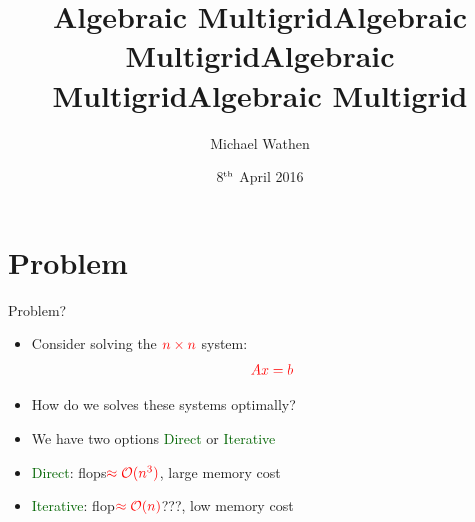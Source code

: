 \documentclass[12pt]{beamer}
\title{Algebraic Multigrid}
\author{Michael Wathen}
\institute{UBC Computer Science}
\date{8$^{\tiny{\mbox{th}}}$ April 2016}
\newcommand{\gr}[1]{\textcolor{darkgreen} {#1}}
\newcommand{\re}[1]{{\textcolor{red}       {#1}}}
\begin{document}
\begin{frame}

\title{Algebraic Multigrid}
\titlepage
\title{Algebraic Multigrid}

\end{frame}

\title{Algebraic Multigrid}




\section{Problem}
\begin{frame}{Problem?}
\begin{itemize}
  \item Consider solving the $\re{n\times n}$ system:
  $$\re{Ax = b}$$
  \item How do we solves these systems optimally?
  \pause
  \vspace{2mm}
  \item We have two options \gr{Direct} or \gr{Iterative}
  \item \gr{Direct}: flops$\re{\approx \mathcal{O}(n^3)}$, large memory cost
  \item \gr{Iterative}: flop$\re{\approx \mathcal{O}(n)}$???, low memory cost
\end{itemize}

\end{frame}
\end{document}
